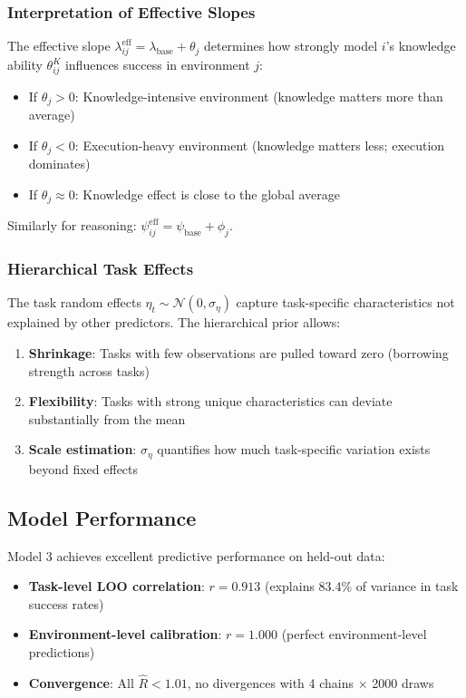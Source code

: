 \documentclass{article}
\begin{document}
\subsubsection{Interpretation of Effective Slopes}
The effective slope $\lambda_{ij}^\text{eff} = \lambda_\text{base} + \theta_j$ determines how strongly model $i$'s knowledge ability $\theta_{ij}^K$ influences success in environment $j$:
\begin{itemize}
    \item If $\theta_j > 0$: Knowledge-intensive environment (knowledge matters more than average)
    \item If $\theta_j < 0$: Execution-heavy environment (knowledge matters less; execution dominates)
    \item If $\theta_j \approx 0$: Knowledge effect is close to the global average
\end{itemize}

Similarly for reasoning: $\psi_{ij}^\text{eff} = \psi_\text{base} + \phi_j$.

\subsubsection{Hierarchical Task Effects}
The task random effects $\eta_t \sim \mathcal{N}(0, \sigma_\eta)$ capture task-specific characteristics not explained by other predictors. The hierarchical prior allows:
\begin{enumerate}
    \item \textbf{Shrinkage}: Tasks with few observations are pulled toward zero (borrowing strength across tasks)
    \item \textbf{Flexibility}: Tasks with strong unique characteristics can deviate substantially from the mean
    \item \textbf{Scale estimation}: $\sigma_\eta$ quantifies how much task-specific variation exists beyond fixed effects
\end{enumerate}

\subsection{Model Performance}

Model 3 achieves excellent predictive performance on held-out data:
\begin{itemize}
    \item \textbf{Task-level LOO correlation}: $r = 0.913$ (explains 83.4\% of variance in task success rates)
    \item \textbf{Environment-level calibration}: $r = 1.000$ (perfect environment-level predictions)
    \item \textbf{Convergence}: All $\hat{R} < 1.01$, no divergences with 4 chains $\times$ 2000 draws
\end{itemize}
\end{document}
